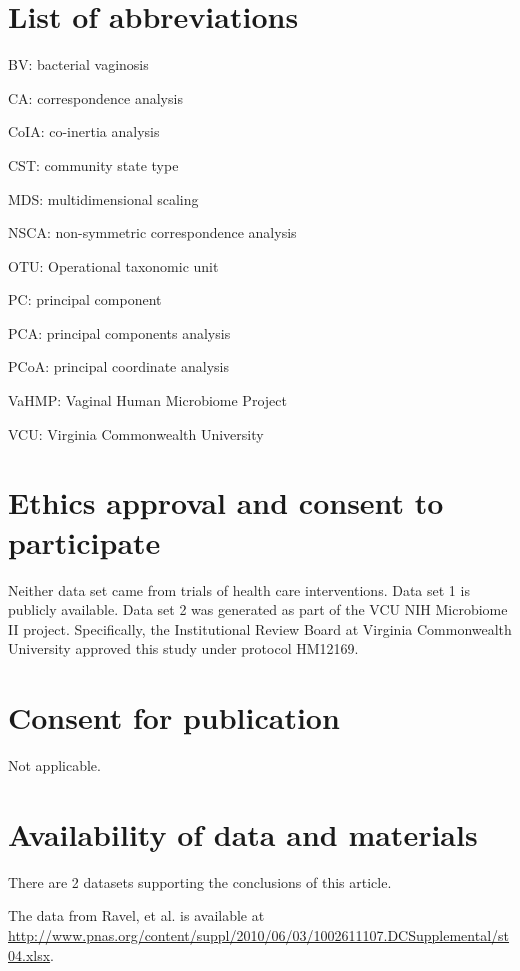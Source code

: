 \documentclass[doublespacing]{bmcart}
\begin{document}
\begin{backmatter}

\section*{List of abbreviations}

 BV: bacterial vaginosis 
 
 CA: correspondence analysis 
 
 CoIA: co-inertia analysis 
 
 CST: community state type 
 
 MDS: multidimensional scaling 
 
 NSCA: non-symmetric correspondence analysis 
 
 OTU: Operational taxonomic unit  
 
 PC: principal component 
 
 PCA: principal components analysis 
 
 PCoA: principal coordinate analysis 
 
 VaHMP: Vaginal Human Microbiome Project 
 
 VCU: Virginia Commonwealth University 

\section*{Ethics approval and consent to participate}

Neither data set came from trials of health care interventions. Data set 1 is publicly available. Data set 2 was generated as part of the VCU NIH  Microbiome II project. Specifically, the Institutional Review Board at Virginia Commonwealth University approved this study under protocol HM12169. 
 

\section*{Consent for publication}
  Not applicable.

\section*{Availability of data and materials}

There are 2 datasets supporting the conclusions of this article.

The data from Ravel, et al. \cite{Ravel} is available at \url{http://www.pnas.org/content/suppl/2010/06/03/1002611107.DCSupplemental/st04.xlsx}.


\end{backmatter}
\end{document}
